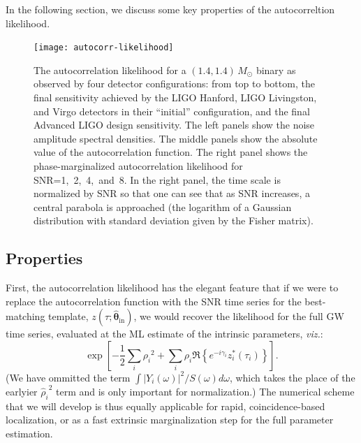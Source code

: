 \documentclass[amsmath,amssymb,aps,prx,reprint,nopreprintnumbers,nofootinbib,showpacs]{revtex4-1}
\begin{document}
In the following section, we discuss some key properties of the autocorreltion likelihood.

\begin{figure}
    \texttt{[image: autocorr-likelihood]}
    \caption{\label{fig:autocorr-likelihood}The autocorrelation likelihood for a $(1.4, 1.4)$\,$M_\odot$ binary as observed by four detector configurations: from top to bottom, the final sensitivity achieved by the \acs{LIGO} Hanford, \acs{LIGO} Livingston, and Virgo detectors in their ``initial'' configuration, and the final Advanced \acs{LIGO} design sensitivity. The left panels show the noise amplitude spectral densities. The middle panels show the absolute value of the autocorrelation function. The right panel shows the phase-marginalized autocorrelation likelihood for \ac{SNR}=1,~2,~4,~and~8. In the right panel, the time scale is normalized by \ac{SNR} so that one can see that as \ac{SNR} increases, a central parabola is approached (the logarithm of a Gaussian distribution with standard deviation given by the Fisher matrix).}
\end{figure}

\subsection{Properties}
\label{sec:properties}

First, the autocorrelation likelihood has the elegant feature that if we were to replace the autocorrelation function with the \ac{SNR} time series for the best-matching template, $z(\tau; \hat{\mathbf{\theta}}_\mathrm{in})$, we would recover the likelihood for the full \ac{GW} time series, evaluated at the \ac{ML} estimate of the intrinsic parameters, \emph{viz.}:
%
\begin{equation}\label{eq:extrinsic-only-likelihood}
    \exp \left[ - \frac{1}{2} \sum_i {\rho_i}^2
        + \sum_i \rho_i \Re \left\{ e^{-i \gamma_i} z_i^*(\tau_i)
        \right\}
    \right].
\end{equation}
%
(We have ommitted the term $\int |Y_i(\omega)|^2/S(\omega)d\omega$, which takes the place of the earlyier ${\hat{\rho}_i}^2$ term and is only important for normalization.) The numerical scheme that we will develop is thus equally applicable for rapid, coincidence-based localization, or as a fast extrinsic marginalization step for the full parameter estimation.
\end{document}
